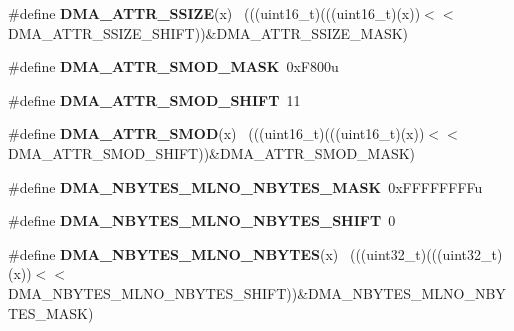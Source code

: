 \begin{DoxyCompactItemize}
\item 
\hypertarget{group___d_m_a___register___masks_ga9f7c3acfc5d849e3cce871f28e870c95}{}\#define {\bfseries D\+M\+A\+\_\+\+A\+T\+T\+R\+\_\+\+S\+S\+I\+Z\+E}(x)                                            ~(((uint16\+\_\+t)(((uint16\+\_\+t)(x))$<$$<$D\+M\+A\+\_\+\+A\+T\+T\+R\+\_\+\+S\+S\+I\+Z\+E\+\_\+\+S\+H\+I\+F\+T))\&D\+M\+A\+\_\+\+A\+T\+T\+R\+\_\+\+S\+S\+I\+Z\+E\+\_\+\+M\+A\+S\+K)\label{group___d_m_a___register___masks_ga9f7c3acfc5d849e3cce871f28e870c95}

\item 
\hypertarget{group___d_m_a___register___masks_ga288d7e465abd4be34477ae308a9b0982}{}\#define {\bfseries D\+M\+A\+\_\+\+A\+T\+T\+R\+\_\+\+S\+M\+O\+D\+\_\+\+M\+A\+S\+K}~0x\+F800u\label{group___d_m_a___register___masks_ga288d7e465abd4be34477ae308a9b0982}

\item 
\hypertarget{group___d_m_a___register___masks_gaebf723df7b7cad164714583c0876a378}{}\#define {\bfseries D\+M\+A\+\_\+\+A\+T\+T\+R\+\_\+\+S\+M\+O\+D\+\_\+\+S\+H\+I\+F\+T}~11\label{group___d_m_a___register___masks_gaebf723df7b7cad164714583c0876a378}

\item 
\hypertarget{group___d_m_a___register___masks_gaa2c8a1d26c1ee7f166555f0d5f506781}{}\#define {\bfseries D\+M\+A\+\_\+\+A\+T\+T\+R\+\_\+\+S\+M\+O\+D}(x)                                              ~(((uint16\+\_\+t)(((uint16\+\_\+t)(x))$<$$<$D\+M\+A\+\_\+\+A\+T\+T\+R\+\_\+\+S\+M\+O\+D\+\_\+\+S\+H\+I\+F\+T))\&D\+M\+A\+\_\+\+A\+T\+T\+R\+\_\+\+S\+M\+O\+D\+\_\+\+M\+A\+S\+K)\label{group___d_m_a___register___masks_gaa2c8a1d26c1ee7f166555f0d5f506781}

\item 
\hypertarget{group___d_m_a___register___masks_ga5898074fa37efdc15af6621cd8daa450}{}\#define {\bfseries D\+M\+A\+\_\+\+N\+B\+Y\+T\+E\+S\+\_\+\+M\+L\+N\+O\+\_\+\+N\+B\+Y\+T\+E\+S\+\_\+\+M\+A\+S\+K}~0x\+F\+F\+F\+F\+F\+F\+F\+Fu\label{group___d_m_a___register___masks_ga5898074fa37efdc15af6621cd8daa450}

\item 
\hypertarget{group___d_m_a___register___masks_ga98cb66e15329c07a5b38d3d10c0d3dbe}{}\#define {\bfseries D\+M\+A\+\_\+\+N\+B\+Y\+T\+E\+S\+\_\+\+M\+L\+N\+O\+\_\+\+N\+B\+Y\+T\+E\+S\+\_\+\+S\+H\+I\+F\+T}~0\label{group___d_m_a___register___masks_ga98cb66e15329c07a5b38d3d10c0d3dbe}

\item 
\hypertarget{group___d_m_a___register___masks_ga790afcefec85c1c0f65569c22d907381}{}\#define {\bfseries D\+M\+A\+\_\+\+N\+B\+Y\+T\+E\+S\+\_\+\+M\+L\+N\+O\+\_\+\+N\+B\+Y\+T\+E\+S}(x)                            ~(((uint32\+\_\+t)(((uint32\+\_\+t)(x))$<$$<$D\+M\+A\+\_\+\+N\+B\+Y\+T\+E\+S\+\_\+\+M\+L\+N\+O\+\_\+\+N\+B\+Y\+T\+E\+S\+\_\+\+S\+H\+I\+F\+T))\&D\+M\+A\+\_\+\+N\+B\+Y\+T\+E\+S\+\_\+\+M\+L\+N\+O\+\_\+\+N\+B\+Y\+T\+E\+S\+\_\+\+M\+A\+S\+K)\label{group___d_m_a___register___masks_ga790afcefec85c1c0f65569c22d907381}


\end{DoxyCompactItemize}
